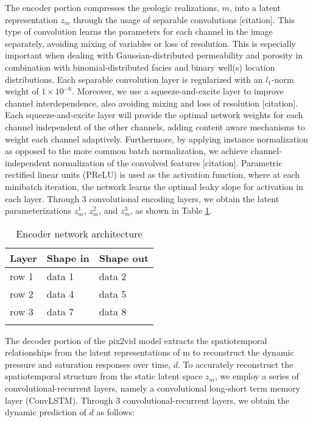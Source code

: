 \documentclass[default,iicol]{sn-jnl}
\begin{document}
The encoder portion compresses the geologic realizations, $m$, into a latent representation $z_m$ through the usage of separable convolutions [citation]. This type of convolution learns the parameters for each channel in the image separately, avoiding mixing of variables or loss of resolution. This is especially important when dealing with Gaussian-distributed permeability and porosity in combination with binomial-distributed facies and binary well(s) location distributions. Each separable convolution layer is regularized with an $l_1$-norm weight of $1\times10^{-6}$. Moreover, we use a squeeze-and-excite layer to improve channel interdependence, also avoiding mixing and loss of resolution [citation]. Each squeeze-and-excite layer will provide the optimal network weights for each channel independent of the other channels, adding content aware mechanisms to weight each channel adaptively. Furthermore, by applying instance normalization as opposed to the more common batch normalization, we achieve channel-independent normalization of the convolved features [citation]. Parametric rectified linear units (PReLU) is used as the activation function, where at each minibatch iteration, the network learns the optimal leaky slope for activation in each layer. Through 3 convolutional encoding layers, we obtain the latent parameterizations $z_m^1$, $z_m^2$, and $z_m^3$, as shown in Table \ref{tab1}.

\begin{table}[h]
\caption{Encoder network architecture}\label{tab1}
\begin{tabular}{@{}lll@{}}
\toprule
Layer & Shape in  & Shape out\\
\midrule
row 1    &   data 1   &   data 2\\
row 2    &   data 4   &   data 5\\
row 3    &   data 7   &   data 8\\
\botrule
\end{tabular}
\end{table}

The decoder portion of the pix2vid model extracts the spatiotemporal relationships from the latent representations of m to reconstruct the dynamic pressure and saturation responses over time, $d$. To accurately reconstruct the spatiotemporal structure from the static latent space $z_m$, we employ a series of convolutional-recurrent layers, namely a convolutional long-short term memory layer (ConvLSTM). Through 3 convolutional-recurrent layers, we obtain the dynamic prediction of $d$ as follows:
\end{document}
